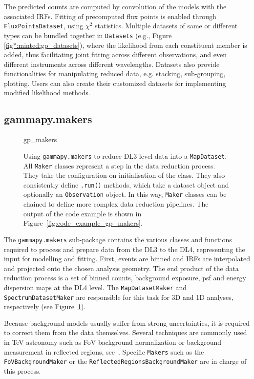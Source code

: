 \documentclass[longauth]{aa}
\newcommand{\code}[1]{\texttt{#1}}
\begin{document}
The predicted counts are computed by convolution of the models with the associated
IRFs. Fitting of precomputed flux points is enabled through \code{FluxPointsDataset},
using \emph{$\chi^2$} statistics. Multiple datasets of same or different types can be
bundled together in \code{Datasets} (e.g., Figure \ref{fig*:minted:gp_datasets}),
where the likelihood from each constituent member is added, thus facilitating
joint fitting across different observations, and even different instruments
across different wavelengths. Datasets also provide functionalities for
manipulating reduced data, e.g. stacking, sub-grouping, plotting. Users can
also create their customized datasets for implementing modified likelihood
methods.

\subsection{gammapy.makers}
\label{ssec:gammapy-makers}
%
\begin{figure}
	\small
    {gp_makers}
	\caption{
        Using \code{gammapy.makers} to reduce DL3 level data into a
		\code{MapDataset}. All \code{Maker} classes represent 
		a step in the data reduction process. They take
        the configuration on initialisation of the class. They 
		also consistently define \code{.run()} methods, which take
		a dataset object and optionally an \code{Observation} 
		object. In this way, \code{Maker} classes can be chained
		to define more complex data reduction pipelines. The output
		of the code example is shown in Figure~\ref{fig:code_example_gp_makers}.
    }
	\label{fig*:minted:gp_makers}
\end{figure}
%
The \code{gammapy.makers} sub-package contains the various classes and functions required
to process and prepare \gammaray data from the DL3 to the DL4, representing the input for modelling and fitting.
First, events are binned and IRFs are interpolated and projected onto the chosen analysis
geometry. The end product of the data reduction process is a set of binned counts,
background exposure, psf and energy dispersion maps at the DL4 level. 
The \code{MapDatasetMaker} and \code{SpectrumDatasetMaker} are
responsible for this task for 3D and 1D analyses, respectively (see Figure~\ref{fig*:minted:gp_makers}).

Because background models usually suffer from strong uncertainties, it is required
to correct them from the data themselves. Several techniques are commonly used
in TeV \gammaray astronomy such as FoV background normalization or
background measurement in reflected regions, see~\cite{Berge07}.
Specific \code{Makers} such as the \code{FoVBackgroundMaker} or the
\code{ReflectedRegionsBackgroundMaker} are in charge of this process.
\end{document}
